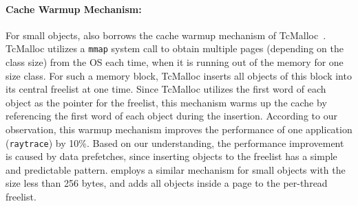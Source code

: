 \paragraph{Cache Warmup Mechanism:} For small objects, \NM{} also borrows the cache warmup mechanism of TcMalloc~\cite{tcmalloc}. TcMalloc utilizes a \texttt{mmap} system call to obtain multiple pages (depending on the class size) from the OS each time, when it is running out of the memory for one size class. For such a memory block, TcMalloc inserts all objects of this block into its central freelist at one time. Since TcMalloc utilizes the first word of each object as the pointer for the freelist, this mechanism warms up the cache by referencing the first word of each object during the insertion. According to our observation, this warmup mechanism improves the performance of one application (\texttt{raytrace}) by 10\%. Based on our understanding, the performance improvement is caused by data prefetches, since inserting objects to the freelist has a simple and predictable pattern. \NM{} employs a similar mechanism for small objects with the size less than 256 bytes, and adds all objects inside a page to the per-thread freelist. 


 

